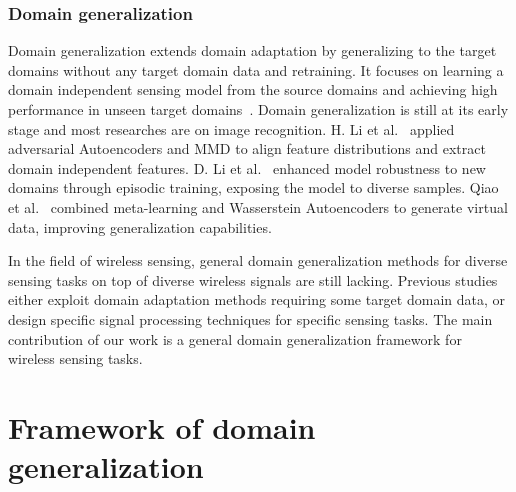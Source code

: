\documentclass[journal]{IEEEtran}
\begin{document}
\subsubsection{Domain generalization}
Domain generalization extends domain adaptation by generalizing to the target domains without any target domain data and retraining. It focuses on learning a domain independent sensing model from the source domains and achieving high performance in unseen target domains~\cite{WangJ:2022}. Domain generalization is still at its early stage and most researches are on image recognition. H. Li et al.~\cite{LiH:2018} applied adversarial Autoencoders and MMD to align feature distributions and extract domain independent features. D. Li et al.~\cite{LiD:2019} enhanced model robustness to new domains through episodic training, exposing the model to diverse samples. Qiao et al.~\cite{QiaoF:2020} combined meta-learning and Wasserstein Autoencoders to generate virtual data, improving generalization capabilities.   

In the field of wireless sensing, general domain generalization methods for diverse sensing tasks on top of diverse wireless signals are still lacking. Previous studies either exploit domain adaptation methods requiring some target domain data, or design specific signal processing techniques for specific sensing tasks. The main contribution of our work is a general domain generalization framework for wireless sensing tasks.

\section{Framework of domain generalization}
\label{SecFramework}
\end{document}
